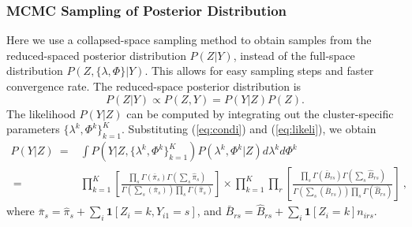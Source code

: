 \subsubsection{MCMC Sampling of Posterior Distribution}
Here we use a collapsed-space sampling method \cite{neal2000markov,collapsed_escobar} to obtain samples from the reduced-spaced posterior distribution $P(Z|Y)$, instead of the full-space distribution $P(Z, \{\lambda, \Phi\} | Y)$. This allows for easy sampling steps and faster convergence rate. 
The reduced-space posterior distribution is
\begin{equation*}
 P(Z|Y) \propto P(Z, Y) = P(Y|Z) P(Z).
\end{equation*}
The likelihood $P(Y|Z)$ can be computed by integrating out the cluster-specific parameters $\{\lambda^k, \Phi^k\}_{k=1}^K$.
Substituting  (\ref{eq:condi}) and (\ref{eq:likeli}), we obtain
\begin{equation*}
\renewcommand*{\arraystretch}{1.9}
\begin{array}{rl}
     P(Y|Z) 
~ = & \int  P(Y| Z, \{\lambda^k, \Phi^k \}_{k=1}^K) P(\lambda^k, \Phi^k | Z) d\lambda^k d\Phi^{k} \\
~ = & \displaystyle{ \prod_{k=1}^K 
      \left[ 
      \frac{\prod_s \Gamma(\bar \pi_s) \Gamma (\sum_s \hat \pi_s)}
           {\Gamma\left( \sum_s (\bar \pi_s) \right) \prod_s \Gamma (\hat \pi_s)}
      \right]  } \times
    \displaystyle{ \prod_{k=1}^K \prod_r 
      \left[ 
      \frac{\prod_s \Gamma(\bar B_{rs}) \Gamma (\sum_s \hat B_{rs})}
           {\Gamma\left( \sum_s (\bar  B_{rs}) \right) \prod_s \Gamma (\hat B_{rs})}
      \right] } ~,
\end{array}
\end{equation*}
where
$\bar \pi _s = \hat \pi_s + \sum_{i} \mathbf{1}[Z_i=k,Y_{i1} = s]$, and
$\bar B_{rs} = \hat B_{rs} + \sum_{i} \mathbf{1}[Z_i=k] n_{irs} $.

